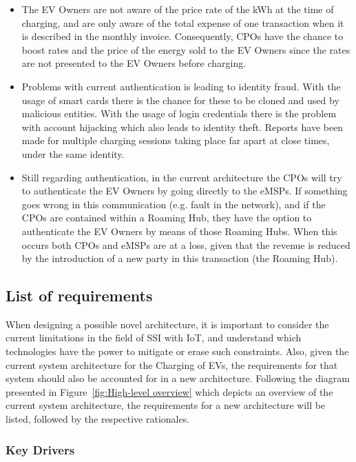 \begin{itemize}
    \item The EV Owners are not aware of the price rate of the kWh at the time of charging, and are only aware of the total expense of one transaction when it is described in the monthly invoice. Consequently, CPOs have the chance to boost rates and the price of the energy sold to the EV Owners since the rates are not presented to the EV Owners before charging.
    \item Problems with current authentication is leading to identity fraud. With the usage of smart cards there is the chance for these to be cloned and used by malicious entities. With the usage of login credentials there is the problem with account hijacking which also leads to identity theft. Reports have been made for multiple charging sessions taking place far apart at close times, under the same identity.
    \item Still regarding authentication, in the current architecture the CPOs will try to authenticate the EV Owners by going directly to the eMSPs. If something goes wrong in this communication (e.g. fault in the network), and if the CPOs are contained within a Roaming Hub, they have the option to authenticate the EV Owners by means of those Roaming Hubs. When this occurs both CPOs and eMSPs are at a loss, given that the revenue is reduced by the introduction of a new party in this transaction (the Roaming Hub).
\end{itemize}

\subsection{List of requirements}
\label{subsec:list_of_requirements_and_decisions}

When designing a possible novel architecture, it is important to consider the current limitations in the field of SSI with IoT, and understand which technologies have the power to mitigate or erase such constraints. Also, given the current system architecture for the Charging of EVs, the requirements for that system should also be accounted for in a new architecture. Following the diagram presented in Figure~\ref{fig:High-level overview} which depicts an overview of the current system architecture, the requirements for a new architecture will be listed, followed by the respective rationales.

\subsubsection{Key Drivers}
\label{subsubsec:key_drivers}

